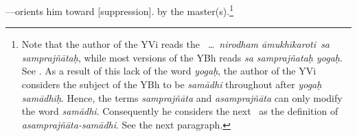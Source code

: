  ---orients him toward
[suppression].   by
the master(s).\footnote{\label{no_yogah}Note that the author of the YVi reads the \YBh\ \emph{\ldots\ nirodham āmukhīkaroti\dd\ sa samprajñātaḥ}, while most versions of the YBh reads \emph{sa samprajñataḥ yogaḥ}.  See \citet[3]{maas:2006}.  As a result of this lack of the word \emph{yogaḥ}, the author of the YVi considers the subject of the YBh to be \emph{samādhi\/} throughout after \emph{yogaḥ samādhiḥ}.  Hence, the terms \emph{samprajñāta\/} and \emph{asamprajñāta\/} can only modify the word \emph{samādhi}.  Consequently he considers the next \sutra\ as the definition of \emph{asamprajñāta-samādhi}.  See the next paragraph.}

